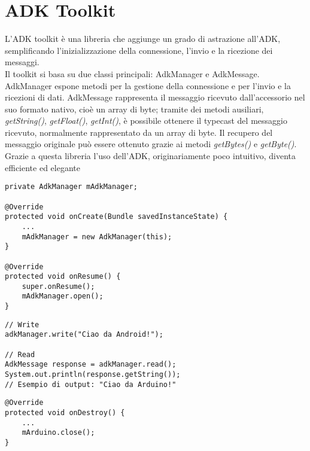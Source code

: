 \section {ADK Toolkit}
L'ADK toolkit è una libreria che aggiunge un grado di astrazione all'ADK, semplificando 
l'inizializzazione della connessione, l'invio e la ricezione dei messaggi.\\
Il toolkit si basa su due classi principali: AdkManager e AdkMessage.	\\	
AdkManager espone metodi per la gestione della connessione e per l'invio e la 
ricezioni di dati. AdkMessage rappresenta il messaggio ricevuto dall'accessorio 
nel suo formato nativo, cioè un array di byte; tramite dei metodi ausiliari, 
\textit{getString()}, \textit{getFloat()}, \textit{getInt()}, è possibile 
ottenere il typecast del messaggio ricevuto, normalmente rappresentato da un array di byte. 
Il recupero del messaggio originale può essere ottenuto grazie ai metodi 
\textit{getBytes()} e \textit{getByte()}.\\
Grazie a questa libreria l'uso dell'ADK, originariamente poco intuitivo, diventa 
efficiente ed elegante
\begin{lstlisting}[caption=Inizializzazione della connessione con l'accessorio]
private AdkManager mAdkManager;

@Override
protected void onCreate(Bundle savedInstanceState) {
    ...
    mAdkManager = new AdkManager(this);
}

@Override
protected void onResume() {
    super.onResume();
    mAdkManager.open();
}
\end{lstlisting}

\begin{lstlisting}[caption=Lettura e scrittura dati]
// Write
adkManager.write("Ciao da Android!");

// Read
AdkMessage response = adkManager.read();
System.out.println(response.getString());
// Esempio di output: "Ciao da Arduino!"
\end{lstlisting}
\begin{lstlisting}[caption=Chiusura della connessione con l'accessorio]
@Override
protected void onDestroy() {
    ...
    mArduino.close();
}
\end{lstlisting}